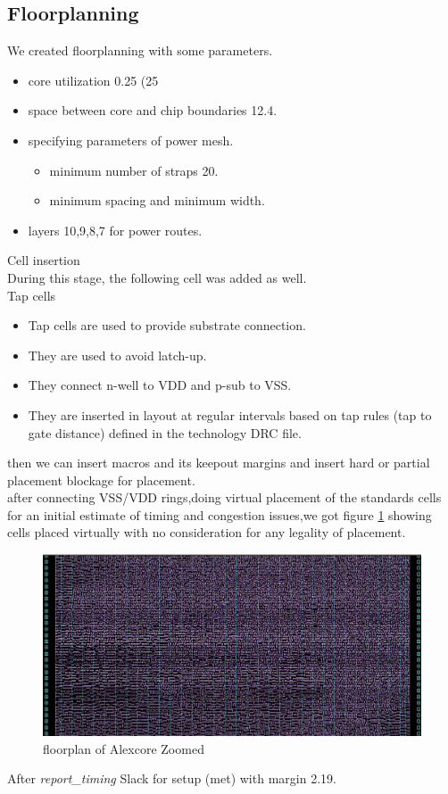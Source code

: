 \documentclass[../main.tex]{subfiles}
\begin{document}
\subsection{Floorplanning} 
We created floorplanning with some parameters.
\begin{itemize}
    \item core utilization 0.25 (25%
    \item space between core and chip boundaries 12.4.
    \item specifying parameters of power mesh.
        \begin{itemize}
            \item minimum number of straps 20.
            \item minimum spacing and minimum width.
        \end{itemize}
    \item layers 10,9,8,7 for power routes. 
\end{itemize}
\newpage Cell insertion\\
During this stage, the following cell was added as well.\\
Tap cells
\begin{itemize}
   \item Tap cells are used to provide substrate connection.
   \item They are used to avoid latch-up.
   \item They connect n-well to VDD and p-sub to VSS.
   \item They are inserted in layout at regular intervals based on tap rules (tap to gate distance) defined in the technology DRC file.
\end{itemize}
then we can insert macros and its keepout margins 
and insert hard or partial placement blockage for placement.\\
after connecting VSS/VDD rings,doing virtual placement of the standards cells for an initial estimate of timing and congestion issues,we got figure \ref{fig:floorplan} showing cells placed virtually with no consideration for any legality of placement.

\begin{figure}[h]
    \centering
    \includegraphics[width=15cm]{diagrams/cellsrandom.JPG}
    \caption{floorplan of Alexcore Zoomed}
    \label{fig:floorplan}
\end{figure}
After \textit {report\_timing} Slack for setup (met) with margin 2.19.
 
\end{document}
